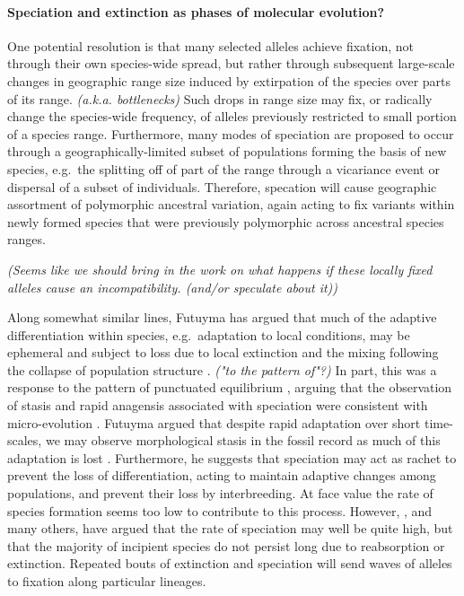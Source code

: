 \documentclass{article}
\newcommand{\plr}[1]{{\it\color{blue}(#1)}}
\begin{document}
\paragraph{Speciation and extinction as phases of molecular evolution?}
One potential resolution is that many selected alleles achieve
fixation, not through their own species-wide spread, but rather
through subsequent large-scale changes in geographic range size
induced by extirpation of the species over parts of its range. 
\plr{a.k.a. bottlenecks}
Such drops in range size may fix, or radically change the species-wide frequency, 
of alleles previously restricted to small portion of a species range. 
Furthermore, many modes of speciation are proposed to occur through a
geographically-limited subset of populations forming the basis of new species, 
e.g.\ the splitting off of part of the range through a vicariance event 
or dispersal of a subset of individuals. 
Therefore, specation will cause geographic assortment of
polymorphic ancestral variation, again acting to fix variants within
newly formed species that were previously polymorphic across ancestral species ranges. 

\plr{Seems like we should bring in the work on what happens if these locally fixed alleles cause an incompatibility. (and/or speculate about it)}

Along somewhat similar lines, Futuyma has argued that much of the adaptive differentiation within species,
e.g.\ adaptation to local conditions, 
may be ephemeral and subject to loss due to local extinction and the mixing 
following the collapse of population structure \citep{Futuyma:10,FUTUYMA:87}. 
\plr{"to the pattern of"?}
In part, this was a response to the pattern of punctuated equilibrium \citep{eldredgegould72}, 
arguing that the observation of stasis and rapid anagensis associated with speciation 
were consistent with micro-evolution \citep[see also ][]{Futuyma:1989editedbook}. 
Futuyma argued that despite rapid adaptation over short time-scales, we
may observe morphological stasis in the fossil record as much of this adaptation is lost 
\citep[see also][]{lieberman:96,Eldredge:05}. 
Furthermore, he suggests that speciation
may act as rachet to prevent the loss of differentiation, acting to
maintain adaptive changes among populations, and prevent their loss by interbreeding. 
At face value the rate of species formation seems too low to contribute to this process. 
However, \citep{Rosenblum:12}, and many others, 
have argued that the rate of speciation may well be quite high,
but that the majority of incipient species do not persist long due to reabsorption or extinction. 
Repeated bouts of extinction and speciation will send waves of alleles
to fixation along particular lineages. 
\end{document}
